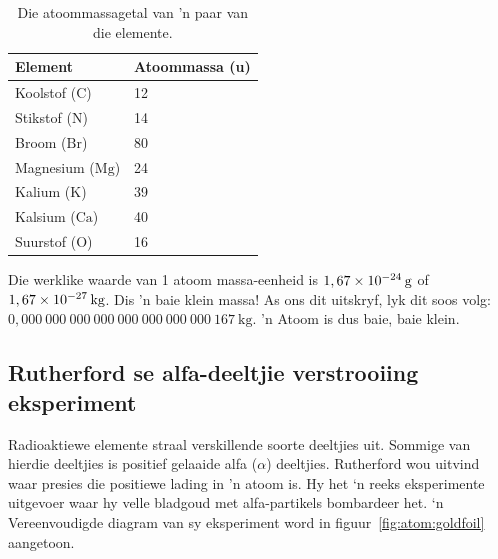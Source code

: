           \begin{table}[H]
        \begin{center}
      \label{m38756*uid8}
    \noindent
      \begin{tabular}{|l|l|}\hline
                  \textbf{Element}
                 &
                  \textbf{Atoommassa (u)}
                \\ \hline
        Koolstof ($\text{C}$) &
        12 \\ \hline
        Stikstof ($\text{N}$) &
        14 \\ \hline
        Broom ($\text{Br}$) &
        80 \\ \hline
        Magnesium ($\text{Mg}$) &
        24 \\ \hline
        Kalium ($\text{K}$) &
        39 \\ \hline
        Kalsium ($\text{Ca}$) &
        40 \\ \hline
        Suurstof ($\text{O}$) &
        16 \\ \hline
    \end{tabular}
      \end{center}
    \caption{Die atoommassagetal van 'n paar van die elemente.}
\label{tab:atomic mass}
\end{table}
    \par
        \label{m38756*id255096}
Die werklike waarde van 1 atoom massa-eenheid is $1,67\ensuremath{\times}{10}^{-24}\phantom{\rule{2pt}{0ex}}\text{g}$ of $1,67\ensuremath{\times}{10}^{-27}\phantom{\rule{2pt}{0ex}}\text{kg}$. Dis 'n baie klein massa! As ons dit uitskryf, lyk dit soos volg: $0,000~000~000~000~000~000~000~000~167~\text{kg}$. 'n Atoom is dus baie, baie klein.\par 
\label{m38756*eip-320}
            \subsection*{Rutherford se alfa-deeltjie verstrooiing eksperiment}
            \nopagebreak
            \label{m38756*id254668}
Radioaktiewe elemente straal verskillende soorte deeltjies uit. Sommige van hierdie deeltjies is positief gelaaide alfa ($\alpha $) deeltjies. Rutherford wou uitvind waar presies die positiewe lading in 'n atoom is. Hy het ‘n reeks eksperimente uitgevoer waar hy velle bladgoud met alfa-partikels bombardeer het. ‘n Vereenvoudigde diagram van sy eksperiment word in figuur~\ref{fig:atom:goldfoil} aangetoon.\par 

